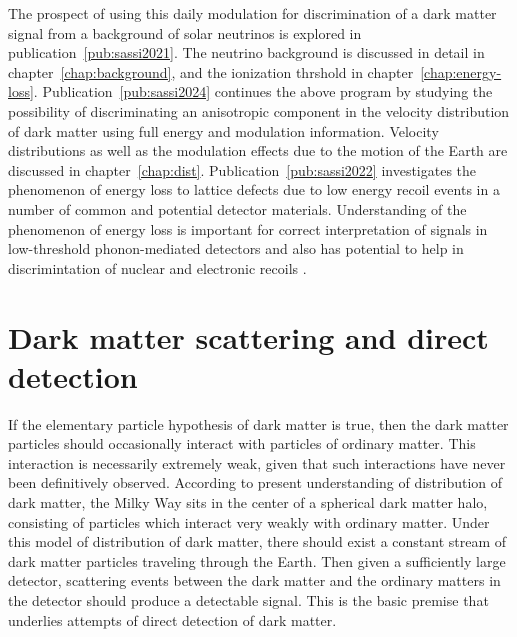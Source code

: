 \documentclass[b5paper, 10pt, twoside]{book}
\begin{document}
The prospect of using this daily modulation for discrimination of a dark matter signal from a background of solar neutrinos is explored in publication~\ref{pub:sassi2021}. The neutrino background is discussed in detail in chapter~\ref{chap:background}, and the ionization thrshold in chapter~\ref{chap:energy-loss}. Publication~\ref{pub:sassi2024} continues the above program by studying the possibility of discriminating an anisotropic component in the velocity distribution of dark matter using full energy and modulation information. Velocity distributions as well as the modulation effects due to the motion of the Earth are discussed in chapter~\ref{chap:dist}. Publication~\ref{pub:sassi2022} investigates the phenomenon of energy loss to lattice defects due to low energy recoil events in a number of common and potential detector materials. Understanding of the phenomenon of energy loss is important for correct interpretation of signals in low-threshold phonon-mediated detectors and also has potential to help in discrimintation of nuclear and electronic recoils \parencite{HeikinheimoEtAl2022}.

\chapter{Dark matter scattering and direct detection}
\label{chap:direct-detection}

If the elementary particle hypothesis of dark matter is true, then the dark matter particles should occasionally interact with particles of ordinary matter. This interaction is necessarily extremely weak, given that such interactions have never been definitively observed. According to present understanding of distribution of dark matter, the Milky Way sits in the center of a spherical dark matter halo, consisting of particles which interact very weakly with ordinary matter. Under this model of distribution of dark matter, there should exist a constant stream of dark matter particles traveling through the Earth. Then given a sufficiently large detector, scattering events between the dark matter and the ordinary matters in the detector should produce a detectable signal. This is the basic premise that underlies attempts of direct detection of dark matter.
\end{document}
